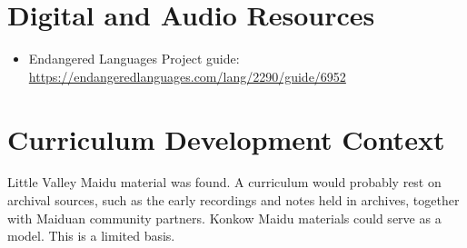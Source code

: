 \documentclass[12pt]{article}
\begin{document}
\section{Digital and Audio Resources}
\begin{itemize}
\item Endangered Languages Project guide: \url{https://endangeredlanguages.com/lang/2290/guide/6952}
\end{itemize}

\section{Curriculum Development Context}
Little Valley Maidu material was found. A curriculum would probably rest on archival sources, such as the early recordings and notes held in archives, together with Maiduan community partners. Konkow Maidu materials could serve as a model. This is a limited basis.
\end{document}
